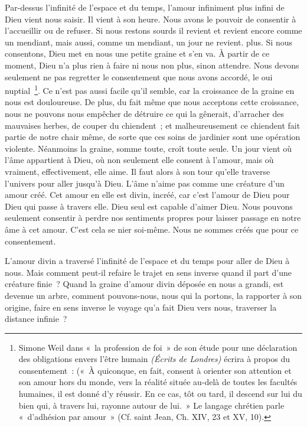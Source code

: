 \documentclass[french,twoside]{book} %
\begin{document}
Par-dessus l'infinité de l'espace et du temps, l'amour infiniment plus infini de Dieu vient nous saisir. Il vient à son heure. Nous avons le pouvoir de consentir à l'accueillir ou de refuser. Si nous restons sourds il revient et revient encore comme un mendiant, mais aussi, comme un mendiant, un jour ne revient. plus. Si nous consentons, Dieu met en nous une petite graine et s'en va. À partir de ce moment, Dieu n'a plus rien à faire ni nous non plus, sinon attendre. Nous devons seulement ne pas regretter le consentement que nous avons accordé, le oui nuptial \footnote{ Simone Weil dans « la profession de foi » de son étude pour une déclaration des obligations envers l'être humain {\itshape (Écrits de Londres)} écrira à propos du consentement : (« À quiconque, en fait, consent à orienter son attention et son amour hors du monde, vers la réalité située au-delà de toutes les facultés humaines, il est donné d'y réussir. En ce cas, tôt ou tard, il descend sur lui du bien qui, à travers lui, rayonne autour de lui. » Le langage chrétien parle « d'adhésion par amour » (Cf. saint Jean, Ch. XIV, 23 et XV, 10).}. Ce n'est pas aussi facile qu'il semble, car la croissance de la graine en nous est douloureuse. De plus, du fait même que nous acceptons cette croissance, nous ne pouvons nous empêcher de détruire ce qui la gênerait, d'arracher des mauvaises herbes, de couper du chiendent ; et malheureusement ce chiendent fait partie de notre chair même, de sorte que ces soins de jardinier sont une opération violente. Néanmoins la graine, somme toute, croît toute seule. Un jour vient où l'âme appartient à Dieu, où non seulement elle consent à l'amour, mais où vraiment, effectivement, elle aime. Il faut alors à son tour qu'elle traverse l'univers pour aller jusqu'à Dieu. L'âme n'aime pas comme une créature d'un amour créé. Cet amour en elle est divin, incréé, car c'est l'amour de Dieu pour Dieu qui passe à travers elle. Dieu seul est capable d'aimer Dieu. Nous pouvons seulement consentir à perdre nos sentiments propres pour laisser passage en notre âme à cet amour. C'est cela se nier soi-même. Nous ne sommes créés que pour ce consentement.\par
L'amour divin a traversé l'infinité de l'espace et du temps pour aller de Dieu à nous. Mais comment peut-il refaire le trajet en sens inverse quand il part d'une créature finie ? Quand la graine d'amour divin déposée en nous a grandi, est devenue un arbre, comment pouvons-nous, nous qui la portons, la rapporter à son origine, faire en sens inverse le voyage qu'a fait Dieu vers nous, traverser la distance infinie ?\par
\end{document}
